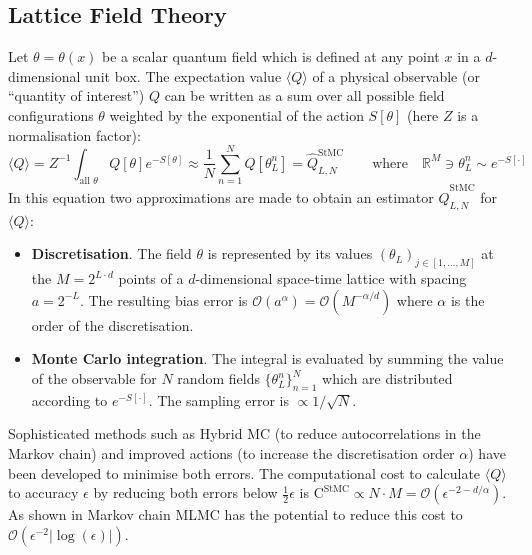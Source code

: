 \documentclass[11pt]{article}
\begin{document}
\subsection{Lattice Field Theory}
Let $\theta=\theta(x)$ be a scalar quantum field which is defined at any point $x$ in a $d$-dimensional unit box. The expectation value $\langle Q\rangle$ of a physical observable (or ``quantity of interest'') $Q$ can be written as a sum over all possible field configurations $\theta$ weighted by the exponential of the action $S[\theta]$ (here $Z$ is a normalisation factor):
\begin{equation}
  \langle Q\rangle = Z^{-1} \int_{\text{all $\theta$}} Q[\theta]e^{-S[\theta]} \approx \frac{1}{N} \sum_{n=1}^N Q[\theta_L^n] = \hat{Q}^{\text{StMC}}_{L,N} \qquad\text{where}\quad \mathbb{R}^{M}\ni \theta_L^n\sim e^{-S[\cdot]}\label{eqn:StMCestimator}
\end{equation}
In this equation two approximations are made to obtain an estimator $\hat{Q}^{\text{StMC}}_{L,N}$ for $\langle Q\rangle$:
\begin{itemize}
\item \textbf{Discretisation}. The field $\theta$ is represented by its values $(\theta_L)_{j\in [1,\dots,M]}$ at the $M=2^{L\cdot d}$ points of a $d$-dimensional space-time lattice with spacing $a=2^{-L}$. The resulting bias error is $\mathcal{O}(a^\alpha)=\mathcal{O}(M^{-\alpha/d})$ where $\alpha$ is the order of the discretisation.
    \item \textbf{Monte Carlo integration}. The integral is evaluated by summing the value of the observable for $N$ random fields $\{\theta_L^n\}_{n=1}^N$ which are distributed according to $e^{-S[\cdot ]}$. The sampling error is $\propto{1/\sqrt{N}}$.
\end{itemize}
Sophisticated methods such as Hybrid MC \cite{Duane1987} (to reduce autocorrelations in the Markov chain) and improved actions \cite{Lepage1994} (to increase the discretisation order $\alpha$) have been developed to minimise both errors.
The computational cost to calculate $\langle Q\rangle$ to accuracy $\epsilon$ by reducing both errors below $\frac{1}{2}\epsilon$ is $\text{C}^{\text{StMC}}\propto N\cdot M=\mathcal{O}(\epsilon^{-2-d/\alpha})$. As shown in \cite{Dodwell2015} Markov chain MLMC has the potential to reduce this cost to $\mathcal{O}(\epsilon^{-2}|\log(\epsilon)|)$.
\end{document}
